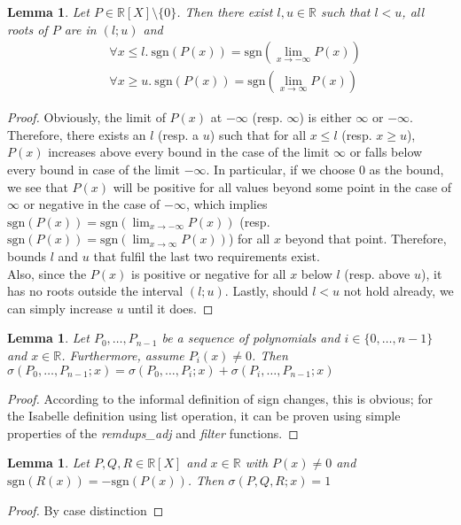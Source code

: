 \documentclass[11pt,a4paper,oneside]{article}
\newtheorem{lemma}[definition]{Lemma}
\newcommand{\RR}{\mathbb{R}}
\newcommand{\sgn}{\mathrm{sgn}}
\begin{document}
\begin{lemma}\label{thm:limits}
Let $P\in\RR[X]\setminus\{0\}$. Then there exist $l,u\in\RR$ such that $l<u$, all roots of $P$ are in $(l;u)$ and
\begin{align*}
&\forall x\leq l.\ \sgn(P(x)) = \sgn\left(\lim\limits_{x\to -\infty} P(x)\right)\\
&\forall x\geq u.\ \sgn(P(x)) = \sgn\left(\lim\limits_{x\to \infty} P(x)\right)
\end{align*}
\end{lemma}
\begin{proof}
Obviously, the limit of $P(x)$ at $-\infty$ (resp. $\infty$) is either $\infty$ or $-\infty$. Therefore, there exists an $l$ (resp. a $u$) such that for all $x\leq l$ (resp. $x\geq u$), $P(x)$ increases above every bound in the case of the limit $\infty$ or falls below every bound in case of the limit $-\infty$. In particular, if we choose 0 as the bound, we see that $P(x)$ will be positive for all values beyond some point in the case of $\infty$ or negative in the case of $-\infty$, which implies $\sgn(P(x)) = \sgn(\lim_{x\to -\infty} P(x))$ (resp. $\sgn(P(x)) = \sgn(\lim_{x\to \infty} P(x))$) for all $x$ beyond that point. Therefore, bounds $l$ and $u$ that fulfil the last two requirements exist.\\
Also, since the $P(x)$ is positive or negative for all $x$ below $l$ (resp. above $u$), it has no roots outside the interval $(l;u)$. Lastly, should $l<u$ not hold already, we can simply increase $u$ until it does.
\end{proof}\vskip3mm

\begin{lemma}\label{thm:sign_changes_distrib}
Let $P_0, \ldots, P_{n-1}$ be a sequence of polynomials and $i\in\{0,\ldots,n-1\}$ and $x\in\RR$. Furthermore, assume $P_i(x) \neq 0$. Then $\sigma(P_0,\ldots,P_{n-1}; x) = \sigma(P_0,\ldots,P_i; x)+\sigma(P_i,\ldots,P_{n-1}; x)$
\end{lemma}
\begin{proof}
According to the informal definition of sign changes, this is obvious; for the Isabelle definition using list operation, it can be proven using simple properties of the \emph{remdups\_adj} and \emph{filter} functions.
\end{proof}\vskip3mm

\begin{lemma}\label{thm:sign_changes_triple}
Let $P,Q,R\in\RR[X]$ and $x\in\RR$ with $P(x)\neq 0$ and $\sgn(R(x)) = -\sgn(P(x))$. Then $\sigma(P,Q,R; x) = 1$
\end{lemma}
\begin{proof}
By case distinction
\end{proof}\vskip3mm
\end{document}
